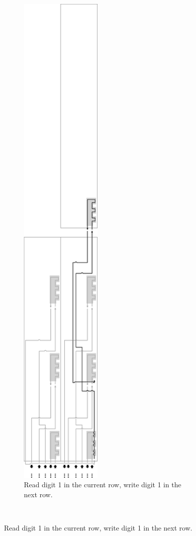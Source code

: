 \begin{figure}[H]
\begin{subfigure}[t]{0.43\textwidth}
        \includegraphics[width=0.43\textwidth]{counter_read_digit1_return_read_digit2_general_case3_middle_level}
        \caption{\label{fig:counter_read_digit1_general_case3_middle_level} Read digit 1 in the current row, write digit 1 in the next row.}
    \end{subfigure}%
    ~
\end{figure}
